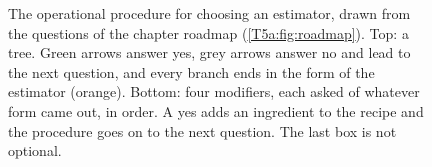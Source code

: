 \begin{figure}[htbp]
\caption{The operational procedure for choosing an estimator, drawn from the
questions of the chapter roadmap (\cref{T5a:fig:roadmap}). Top: a tree. Green
arrows answer yes, grey arrows answer no and lead to the next question, and every
branch ends in the form of the estimator (orange). Bottom: four
modifiers, each asked of whatever form came out, in order. A yes adds an
ingredient to the recipe and the procedure goes on to the next question. The
last box is not optional.}
\label{T5b:fig:decision}
\end{figure}

